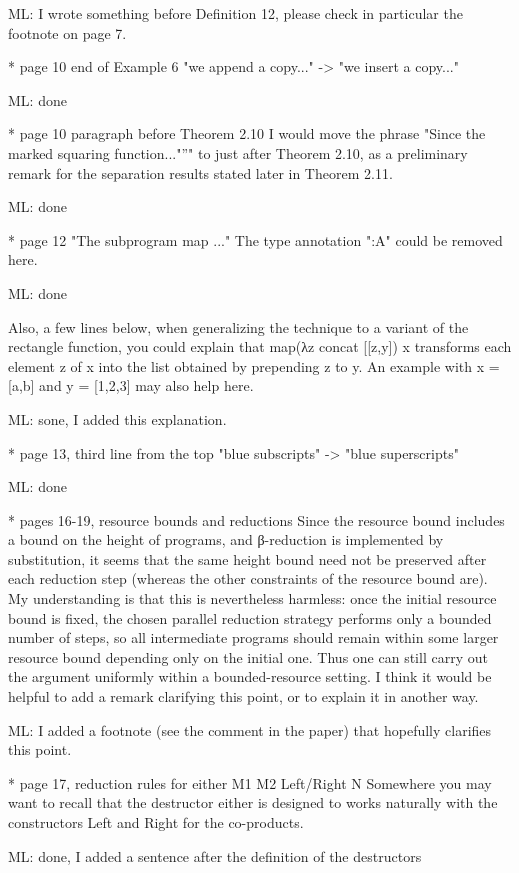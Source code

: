 ML: I wrote something before Definition 12, please check in particular the footnote on page 7.

* page 10 end of Example 6
"we append a copy..." -> "we insert a copy..."

ML: done

* page 10 paragraph before Theorem 2.10
I would move the phrase "Since the marked squaring function..."”" to just after Theorem 2.10, 
as a preliminary remark for the separation results stated later in Theorem 2.11.

ML: done

* page 12 "The subprogram map ..."
The type annotation ":A" could be removed here.

ML: done

Also, a few lines below, when generalizing the technique to a variant of the rectangle function, you could 
explain that  map(λz concat [[z,y]) x  transforms each element z of x into the list obtained by prepending
z to y. An example with x = [a,b] and y = [1,2,3] may also help here.

ML: sone, I added this explanation.

* page 13, third line from the top
"blue subscripts" -> "blue superscripts"

ML: done

* pages 16-19, resource bounds and reductions
Since the resource bound includes a bound on the height of programs, and β-reduction is implemented by substitution, 
it seems that the same height bound need not be preserved after each reduction step (whereas the other constraints 
of the resource bound are). My understanding is that this is nevertheless harmless: once the initial resource bound 
is fixed, the chosen parallel reduction strategy performs only a bounded number of steps, so all intermediate 
programs should remain within some larger resource bound depending only on the initial one. Thus one can still 
carry out the argument uniformly within a bounded-resource setting. 
I think it would be helpful to add a remark clarifying this point, or to explain it in another way.

ML: I added a footnote (see the comment in the paper) that hopefully clarifies this point.

* page 17, reduction rules for either M1 M2 Left/Right N
Somewhere you may want to recall that the destructor  either  is designed to works naturally 
with the constructors  Left  and  Right  for the co-products.

ML: done, I added a sentence after the definition of the destructors

